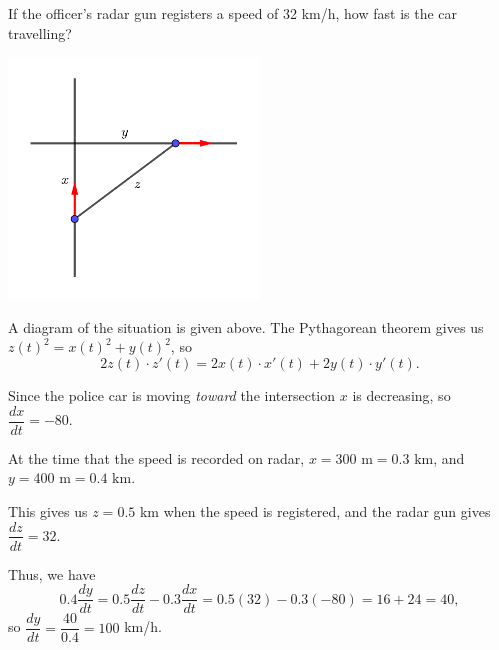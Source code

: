 \documentclass[12pt]{article}
\begin{document}
\begin{enumerate}
If the officer's radar gun registers a speed of 32 km/h, how fast is the car travelling?

\begin{center}
\includegraphics[width=0.5\textwidth]{Tut7-3sol}
\end{center}




A diagram of the situation is given above. The Pythagorean theorem gives us $z(t)^2=x(t)^2+y(t)^2$, so 
\[
2z(t)\cdot z'(t) = 2x(t)\cdot x'(t)+2y(t)\cdot y'(t).
\]

Since the police car is moving \textit{toward} the intersection $x$ is decreasing, so $\dfrac{dx}{dt} = -80$. 

At the time that the speed is recorded on radar, $x=300 \text{ m} = 0.3 \text{ km}$, and $y=400 \text{ m} = 0.4\text{ km}$. 

This gives us $z=0.5$ km  when the speed is registered, and the radar gun gives $\dfrac{dz}{dt} = 32$. 

Thus, we have
\[
0.4\frac{dy}{dt} = 0.5\frac{dz}{dt}-0.3\frac{dx}{dt} = 0.5(32)-0.3(-80) = 16+24=40,
\]
so $\dfrac{dy}{dt} = \dfrac{40}{0.4} = 100$ km/h.
\end{enumerate}
\end{document}
